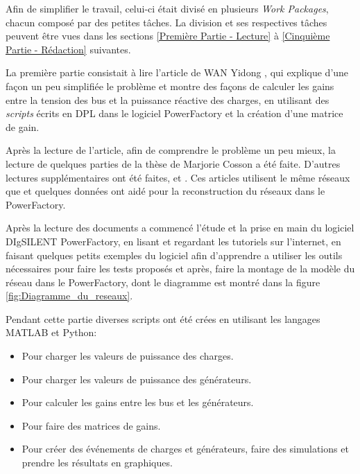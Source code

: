 Afin de simplifier le travail, celui-ci était divisé en plusieurs \textit{Work Packages}, chacun composé par des petites tâches. La division et ses respectives tâches peuvent être vues dans les sections \ref{Première Partie  - Lecture} à \ref{Cinquième Partie - Rédaction} suivantes.

La première partie consistait à lire l'article de WAN Yidong \cite{yidong}, qui explique d'une façon un peu simplifiée le problème et montre des façons de calculer les gains entre la tension des bus et la puissance réactive des charges, en utilisant des \textit{scripts} écrits en \gls{DPL} dans le logiciel PowerFactory et la création d'une matrice de gain.

Après la lecture de l'article, afin de comprendre le problème un peu mieux, la lecture de quelques parties de la thèse de Marjorie Cosson \cite{cosson:tel-01374469}  a été faite.
D'autres lectures supplémentaires ont été faites, \cite{farina2015model} et \cite{mariani2013controllo}. Ces articles utilisent le même réseaux que \cite{cosson:tel-01374469} et quelques données ont aidé pour la reconstruction du réseaux dans le PowerFactory.


Après la lecture des documents a commencé l'étude et la prise en main du logiciel DIgSILENT PowerFactory, en lisant et regardant les tutoriels sur l'internet, en faisant quelques petits exemples du logiciel afin d'apprendre a utiliser les outils nécessaires pour faire les tests proposés et après, faire la montage de la modèle du réseau dans le PowerFactory, dont le diagramme est montré dans la figure \ref{fig:Diagramme_du_reseaux}. 

Pendant cette partie diverses scripts ont été crées en utilisant les langages MATLAB et Python:
\begin{itemize}
	\item Pour charger les valeurs de puissance des charges.
	\item Pour charger les valeurs de puissance des générateurs.
	\item Pour calculer les gains entre les bus et les générateurs.
	\item Pour faire des matrices de gains.
	\item Pour créer des événements de charges et générateurs, faire des simulations et prendre les résultats en graphiques.
\end{itemize}

